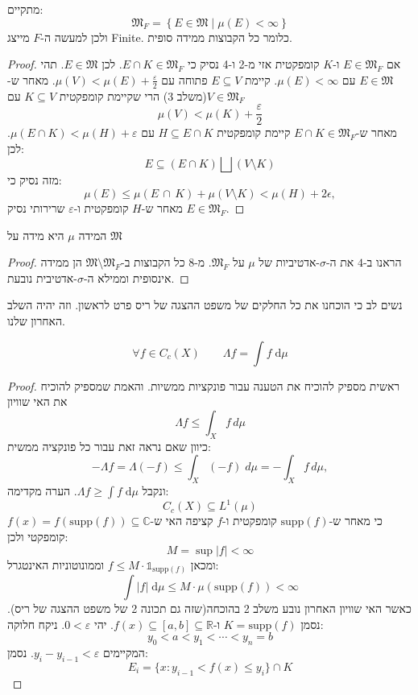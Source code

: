 \documentclass{tstextbook}
\begin{document}
\begin{lemma}[שלב 8]
מתקיים:
$$\mathfrak{M} _{F}=\left\{  E \in \mathfrak{M} \mid \mu(E)< \infty  \right\}$$
ולכן למעשה ה-\(F\) מייצג Finite. כלומר כל הקבוצות ממידה סופית.

\end{lemma}
\begin{proof}
אם \(E \in \mathfrak{M}_{F}\) ו-\(K\) קומפקטית אזי מ-2 ו-4 נסיק כי \(E\cap K \in \mathfrak{M}_{F}\). לכן \(E \in \mathfrak{M}\). תהי \(E \in \mathfrak{M}\) עם \(\mu(E)<\infty\). קיימת \(E \subseteq V\) פתוחה עם \(\mu(V)<\mu(E)+\frac{\varepsilon}{2}\). מאחר ש-\(V \in \mathfrak{M}_{F}\)(משלב 3) הרי שקיימת קומפקטית \(K \subseteq V\) עם
$$\mu(V)<\mu(K)+\frac{\varepsilon}{2}$$
מאחר ש-\(E\cap K \in \mathfrak{M}_{F}\) קיימת קומפקטית \(H \subseteq E \cap K\) עם \(\mu\left( E\cap K \right)<\mu(H)+\varepsilon\). לכן:
$$E\subseteq \left( E\cap K \right)\bigsqcup \left( V \setminus  K \right)$$
מזה נסיק כי:
$$\mu(E)\leq\mu\left( E\,\cap\,K \right)+\mu\left( V\setminus K \right)<\mu(H)+2\epsilon,$$
מאחר ש-\(H\) קומפקטית ו-\(\varepsilon\) שרירותי נסיק \(E \in \mathfrak{M}_{F}\).

\end{proof}
\begin{lemma}[שלב 9]
המידה \(\mu\) היא מידה על \(\mathfrak{M}\)

\end{lemma}
\begin{proof}
הראנו ב-\(4\) את ה-\(\sigma\)-אדטיביות של \(\mu\) על \(\mathfrak{M}_{F}\). מ-8 כל הקבוצות ב-\(\mathfrak{M}\setminus \mathfrak{M}_{F}\) הן ממידה אינסופית וממילא ה-\(\sigma\)-אדטיבית נובעת.

\end{proof}
\begin{remark}
נשים לב כי הוכחנו את כל החלקים של משפט ההצגה של ריס פרט לראשון. וזה יהיה השלב האחרון שלנו.

\end{remark}
\begin{lemma}[שלב 10]
$$\forall f \in C_{c}(X)\qquad \Lambda f=\int f \;\mathrm{d} \mu $$

\end{lemma}
\begin{proof}
ראשית מספיק להוכיח את הטענה עבור פונקציות ממשיות. והאמת שמספיק להוכיח את האי שוויון
$$\Lambda f\leq\int_{X}f\,d\mu$$
כיוון שאם נראה זאת עבור כל פונקציה ממשית:
$$-\Lambda f=\Lambda(-f)\leq\int_{X}(-f)\;d\mu=-\int_{X}f\,d\mu,$$
ונקבל \(\Lambda f \geq \int f \;\mathrm{d} \mu\).
הערה מקדימה:
$$C_{c}(X)\subseteq L^{1}\left( \mu \right)$$
כי מאחר ש-\(\text{supp}(f)\) קומפקטית ו-\(f\) קציפה האי ש-\(f(x)=f\left( \text{supp}(f) \right)\subseteq \mathbb{C}\) קומפקטי ולכן:
$$M=\sup \lvert f \rvert < \infty$$
ומכאן \(f\leq M\cdot \mathbb{1}_{\text{supp}(f)}\) וממונוטוניות האינטגרל:
$$\int \lvert f \rvert  \;\mathrm{d} \mu \leq M \cdot \mu\left( \text{supp}(f) \right)<\infty $$
כאשר האי שוויון האחרון נובע משלב 2 בהוכחה(שזה גם תכונה 2 של משפט ההצגה של ריס). נסמן \(K=\text{supp}(f)\) ו-\(f(x)\subseteq [a,b]\subseteq \mathbb{R}\). יהי \(0<\varepsilon\). ניקח חלוקה:
$$y_{0}<a<y_{1}<\cdots<y_{n}=b$$
המקיימים \(y_{i}-y_{i-1}<\varepsilon\). נסמן:
$$E_{i}=\{x\colon y_{i-1}<f(x)\leq y_{i}\}\cap K$$

\end{proof}
\end{document}
